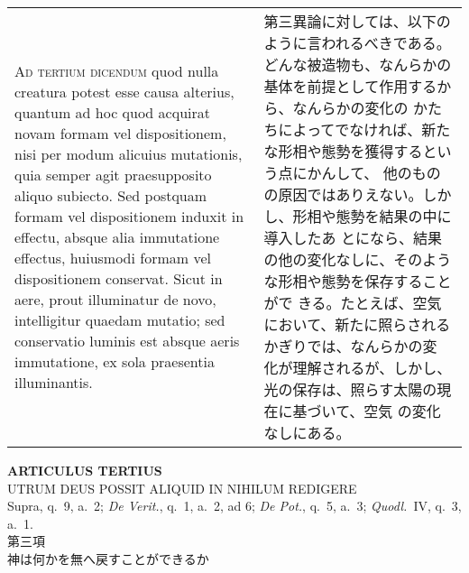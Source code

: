 \documentclass[10pt]{jsarticle} %
\begin{document}
\begin{longtable}{p{21em}p{21em}}
\\


{\scshape Ad tertium dicendum} quod nulla creatura
potest esse causa alterius, quantum ad hoc quod acquirat novam formam
vel dispositionem, nisi per modum alicuius mutationis, quia semper agit
praesupposito aliquo subiecto. Sed postquam formam vel dispositionem
induxit in effectu, absque alia immutatione effectus, huiusmodi formam
vel dispositionem conservat. Sicut in aere, prout illuminatur de novo,
intelligitur quaedam mutatio; sed conservatio luminis est absque aeris
immutatione, ex sola praesentia illuminantis.

&


第三異論に対しては、以下のように言われるべきである。
どんな被造物も、なんらかの基体を前提として作用するから、なんらかの変化の
 かたちによってでなければ、新たな形相や態勢を獲得するという点にかんして、
 他のものの原因ではありえない。しかし、形相や態勢を結果の中に導入したあ
 とになら、結果の他の変化なしに、そのような形相や態勢を保存することがで
 きる。たとえば、空気において、新たに照らされるかぎりでは、なんらかの変
 化が理解されるが、しかし、光の保存は、照らす太陽の現在に基づいて、空気
 の変化なしにある。


\end{longtable}
\newpage





\begin{center}
 {\Large {\bf ARTICULUS TERTIUS}}\\
 {\large UTRUM DEUS POSSIT ALIQUID IN NIHILUM REDIGERE}\\
 {\footnotesize Supra, q.~9, a.~2; {\itshape De Verit.}, q.~1, a.~2, ad
 6; {\itshape De Pot.}, q.~5, a.~3; {\itshape Quodl.}~IV, q.~3, a.~1.}\\
 {\Large 第三項\\神は何かを無へ戻すことができるか}
\end{center}
\end{document}
